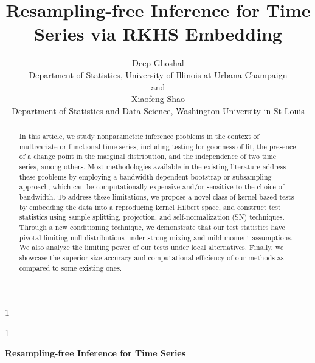 \documentclass[11pt]{article}
\newcommand{\blind}{1}
\theoremstyle{plain}
\theoremstyle{definition}
\theoremstyle{remark}
\begin{document}
\date{}

%

\def\spacingset#1{\renewcommand{\baselinestretch}%
{#1}\small\normalsize} \spacingset{1}



\blind
{
  \title{ Resampling-free Inference for Time Series via RKHS Embedding}
  \author{Deep Ghoshal \hspace{.2cm}\\
    Department of Statistics, University of Illinois at Urbana-Champaign\\
    and \\
    Xiaofeng Shao \\
   Department of Statistics and Data Science,
 Washington University in St Louis}
  \maketitle
} \fi

\blind
{
  \bigskip
  \bigskip
  \bigskip
  \begin{center}
    {\LARGE\bf Resampling-free Inference for Time Series }
\end{center}
  \medskip
} \fi

\bigskip
\begin{abstract}
In this article, we study nonparametric inference problems in the context of multivariate or functional time series, including testing for goodness-of-fit, the presence of a change point in the marginal distribution, and the independence of two time series, among others. Most methodologies available in the existing literature address these problems by employing a bandwidth-dependent bootstrap or subsampling approach, which can be computationally expensive and/or sensitive to the choice of bandwidth.  To address these limitations, we propose a novel class of  kernel-based tests by embedding the data into a reproducing kernel Hilbert space, and construct test statistics using sample splitting, projection, and self-normalization (SN) techniques. Through a new conditioning technique, we demonstrate that our test statistics have pivotal limiting null distributions under strong mixing and mild moment assumptions. We also analyze the limiting power of our tests under local alternatives. Finally, we showcase the superior size accuracy and computational efficiency of our methods as compared to some existing ones.
\end{abstract}
\end{document}
